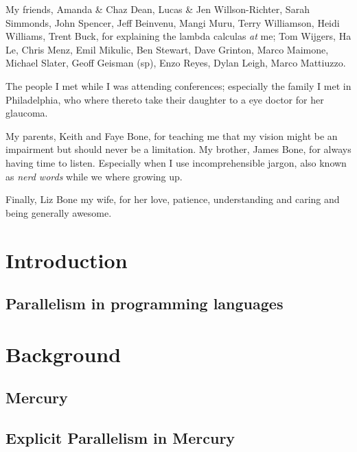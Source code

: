 \documentclass[a4paper,twoside]{report}
\begin{document}
My friends,
Amanda \& Chaz Dean,
Lucas \& Jen Willson-Richter,
Sarah Simmonds, John Spencer,
Jeff Beinvenu, Mangi Muru, 
Terry Williamson, Heidi Williams,
Trent Buck, for explaining the lambda calculas \emph{at} me;
Tom Wijgers,
Ha Le,
Chris Menz,
Emil Mikulic,
Ben Stewart,
Dave Grinton,
Marco Maimone,
Michael Slater,
Geoff Geisman (sp),
Enzo Reyes,
Dylan Leigh,
Marco Mattiuzzo.

The people I met while I was attending conferences;
especially the family I met in Philadelphia,
who where thereto take their daughter to a eye doctor for her glaucoma.

My parents, Keith and Faye Bone,
for teaching me that my vision might be an impairment but should never
be a limitation.
My brother, James Bone, for always having time to listen.
Especially when I use incomprehensible jargon,
also known as \emph{nerd words} while we where growing up.

Finally, Liz Bone my wife,
for her love, patience, understanding and caring
and being generally awesome.


\tableofcontents

\listoffigures

\listoftables

\listofalgorithms

\chapter{Introduction}
\label{chap:intro}


\section{Parallelism in programming languages}
\label{sec:literature_review}


\chapter{Background}

\section{Mercury}
\label{sec:backgnd_mercury}


\section{Explicit Parallelism in Mercury}
\label{sec:backgnd_merpar}

\end{document}
